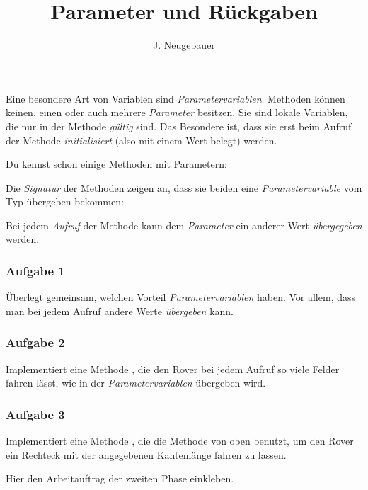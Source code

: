 \documentclass[10pt, a4paper]{scrartcl}
\author{J. Neugebauer}
\title{Parameter und Rückgaben}
\date{\Heute}
\begin{document}
\ReiheTitel[Parameter]

Eine besondere Art von Variablen sind \emph{Parametervariablen}. Methoden können keinen, einen oder auch mehrere \emph{Parameter} besitzen. Sie sind lokale Variablen, die nur in der Methode \emph{gültig} sind. Das Besondere ist, dass sie erst beim Aufruf der Methode \emph{initialisiert} (also mit einem Wert belegt) werden.

Du kennst schon einige Methoden mit Parametern:
\begin{smallitemize}
	\item {}
	\item {}
\end{smallitemize}

Die \emph{Signatur} der Methoden zeigen an, dass sie beiden eine \emph{Parametervariable} vom Typ  übergeben bekommen: 

Bei jedem \emph{Aufruf} der Methode kann dem \emph{Parameter} ein anderer Wert \emph{übergegeben} werden.

\subsubsection*{Aufgabe 1}
Überlegt gemeinsam, welchen Vorteil \emph{Parametervariablen} haben. Vor allem, dass man bei jedem Aufruf andere Werte \emph{übergeben} kann.

\subsubsection*{Aufgabe 2}
Implementiert eine Methode , die den Rover bei jedem Aufruf so viele Felder fahren lässt, wie in der \emph{Parametervariablen} übergeben wird.

\subsubsection*{Aufgabe 3}
Implementiert eine Methode , die die Methode  von oben benutzt, um den Rover ein Rechteck mit der angegebenen Kantenlänge fahren zu lassen.

\vspace{2cm}
\begin{tcolorbox}[colframe=black!60,colback=black!10,width=\textwidth,height=5cm,center,boxrule=1pt]
\begin{center}
Hier den Arbeitauftrag der zweiten Phase einkleben.
\end{center}
\end{tcolorbox}
\end{document}
